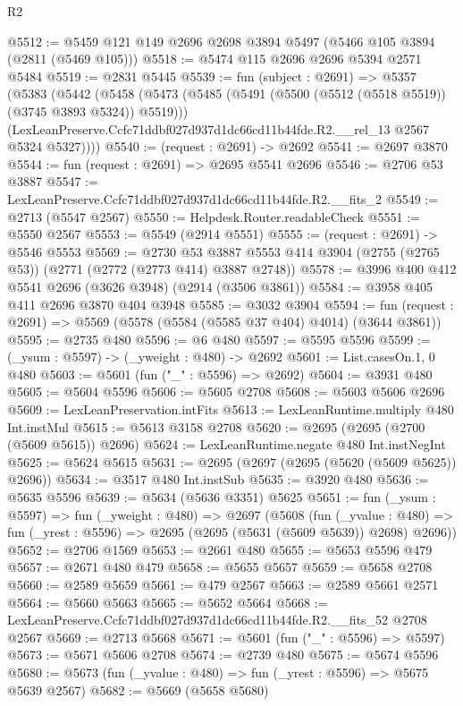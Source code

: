 \begin{lexlean}{R2}
\begin{coremodule}
@5512 := @5459 @121 @149 @2696 @2698 @3894 @5497 (@5466 @105 @3894 (@2811 (@5469 @105)))
@5518 := @5474 @115 @2696 @2696 @5394 @2571 @5484
@5519 := @2831 @5445
@5539 := fun (subject : @2691) =>
  @5357
    (@5383
      (@5442
        (@5458
          (@5473 (@5485 (@5491 (@5500 (@5512 (@5518 @5519)) (@3745 @3893 @5324)) @5519)))
          (LexLeanPreserve.Ccfc71ddbf027d937d1dc66cd11b44fde.R2.__rel_13 @2567 @5324 @5327))))
@5540 := (request : @2691) -> @2692
@5541 := @2697 @3870
@5544 := fun (request : @2691) => @2695 @5541 @2696
@5546 := @2706 @53 @3887
@5547 := LexLeanPreserve.Ccfc71ddbf027d937d1dc66cd11b44fde.R2.__fits_2
@5549 := @2713 (@5547 @2567)
@5550 := Helpdesk.Router.readableCheck
@5551 := @5550 @2567
@5553 := @5549 (@2914 @5551)
@5555 := (request : @2691) -> @5546 @5553
@5569 := @2730
    @53
    @3887
    @5553
    @414
    @3904
    (@2755 (@2765 @53))
    (@2771 (@2772 (@2773 @414) @3887 @2748))
@5578 := @3996 @400 @412 @5541 @2696 (@3626 @3948) (@2914 (@3506 @3861))
@5584 := @3958 @405 @411 @2696 @3870 @404 @3948
@5585 := @3032 @3904
@5594 := fun (request : @2691) => @5569 (@5578 (@5584 (@5585 @37 @404) @4014) (@3644 @3861))
@5595 := @2735 @480
@5596 := @6 @480
@5597 := @5595 @5596
@5599 := (_ysum : @5597) -> (_yweight : @480) -> @2692
@5601 := List.casesOn.{1, 0} @480
@5603 := @5601 (fun ("_" : @5596) => @2692)
@5604 := @3931 @480
@5605 := @5604 @5596
@5606 := @5605 @2708
@5608 := @5603 @5606 @2696
@5609 := LexLeanPreservation.intFits
@5613 := LexLeanRuntime.multiply @480 Int.instMul
@5615 := @5613 @3158 @2708
@5620 := @2695 (@2695 (@2700 (@5609 @5615)) @2696)
@5624 := LexLeanRuntime.negate @480 Int.instNegInt
@5625 := @5624 @5615
@5631 := @2695 (@2697 (@2695 (@5620 (@5609 @5625)) @2696))
@5634 := @3517 @480 Int.instSub
@5635 := @3920 @480
@5636 := @5635 @5596
@5639 := @5634 (@5636 @3351) @5625
@5651 := fun (_ysum : @5597) =>
  fun (_yweight : @480) =>
  @2697
    (@5608
      (fun (_yvalue : @480) =>
      fun (_yrest : @5596) => @2695 (@2695 (@5631 (@5609 @5639)) @2698) @2696))
@5652 := @2706 @1569
@5653 := @2661 @480
@5655 := @5653 @5596 @479
@5657 := @2671 @480 @479
@5658 := @5655 @5657
@5659 := @5658 @2708
@5660 := @2589 @5659
@5661 := @479 @2567
@5663 := @2589 @5661 @2571
@5664 := @5660 @5663
@5665 := @5652 @5664
@5668 := LexLeanPreserve.Ccfc71ddbf027d937d1dc66cd11b44fde.R2.__fits_52 @2708 @2567
@5669 := @2713 @5668
@5671 := @5601 (fun ("_" : @5596) => @5597)
@5673 := @5671 @5606 @2708
@5674 := @2739 @480
@5675 := @5674 @5596
@5680 := @5673 (fun (_yvalue : @480) => fun (_yrest : @5596) => @5675 @5639 @2567)
@5682 := @5669 (@5658 @5680)

\end{coremodule}
\end{lexlean}
